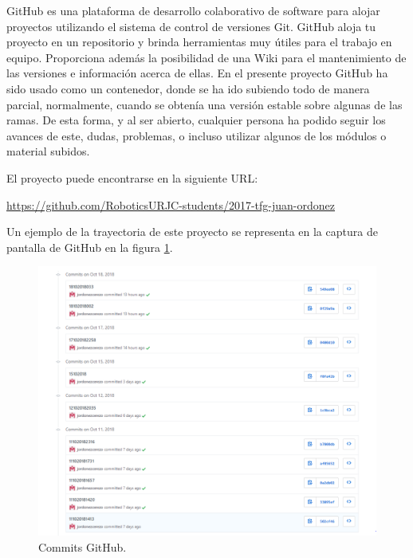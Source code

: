 GitHub es una plataforma de desarrollo colaborativo de software para alojar proyectos utilizando el sistema de control de versiones Git. GitHub aloja tu proyecto en un repositorio y brinda herramientas muy útiles para el trabajo en equipo. \newline
Proporciona además la posibilidad de una Wiki para el mantenimiento de las versiones e información acerca de ellas. \newline
En el presente proyecto GitHub ha sido usado como un contenedor, donde se ha ido subiendo todo de manera parcial, normalmente, cuando se obtenía una versión estable sobre algunas de las ramas. \newline
De esta forma, y al ser abierto, cualquier persona ha podido seguir los avances de este, dudas, problemas, o incluso utilizar algunos de los módulos o material subidos. \newline
 
El proyecto puede encontrarse en la siguiente URL: \newline

\hyperref[]{https://github.com/RoboticsURJC-students/2017-tfg-juan-ordonez}

Un ejemplo de la trayectoria de este proyecto se representa en la captura de pantalla de GitHub en la figura \ref{fig:capturaGit}.

\begin{figure}[H]
	\center
	\includegraphics[trim = 0mm 0mm 0mm 0mm, clip,scale=0.5]{imagenes/Introduction/CapturaGit}
	\caption{Commits GitHub.}
	\label{fig:capturaGit}
\end{figure}

